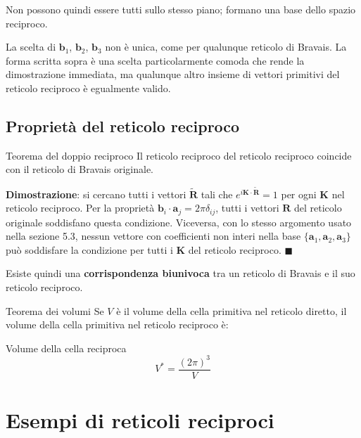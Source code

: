 Non possono quindi essere tutti sullo stesso piano; formano una base dello spazio reciproco.

\begin{nota}
La scelta di $\mathbf{b}_1$, $\mathbf{b}_2$, $\mathbf{b}_3$ non è unica, come per qualunque reticolo di Bravais. La forma scritta sopra è una scelta particolarmente comoda che rende la dimostrazione immediata, ma qualunque altro insieme di vettori primitivi del reticolo reciproco è egualmente valido.
\end{nota}

\subsection{Proprietà del reticolo reciproco}

\begin{definizione}{Teorema del doppio reciproco}
Il reticolo reciproco del reticolo reciproco coincide con il reticolo di Bravais originale.
\end{definizione}

\textbf{Dimostrazione}: si cercano tutti i vettori $\tilde{\mathbf{R}}$ tali che $e^{i\mathbf{K} \cdot \tilde{\mathbf{R}}} = 1$ per ogni $\mathbf{K}$ nel reticolo reciproco. Per la proprietà $\mathbf{b}_i \cdot \mathbf{a}_j = 2\pi \delta_{ij}$, tutti i vettori $\mathbf{R}$ del reticolo originale soddisfano questa condizione. Viceversa, con lo stesso argomento usato nella sezione 5.3, nessun vettore con coefficienti non interi nella base $\{\mathbf{a}_1, \mathbf{a}_2, \mathbf{a}_3\}$ può soddisfare la condizione per tutti i $\mathbf{K}$ del reticolo reciproco. $\blacksquare$

Esiste quindi una \textbf{corrispondenza biunivoca} tra un reticolo di Bravais e il suo reticolo reciproco.


\begin{definizione}{Teorema dei volumi}
Se $V$ è il volume della cella primitiva nel reticolo diretto, il volume della cella primitiva nel reticolo reciproco è:
\end{definizione}

\begin{equazione}{Volume della cella reciproca}
\begin{equation}
V^* = \frac{(2\pi)^3}{V}
\end{equation}
\end{equazione}

\section{Esempi di reticoli reciproci}

